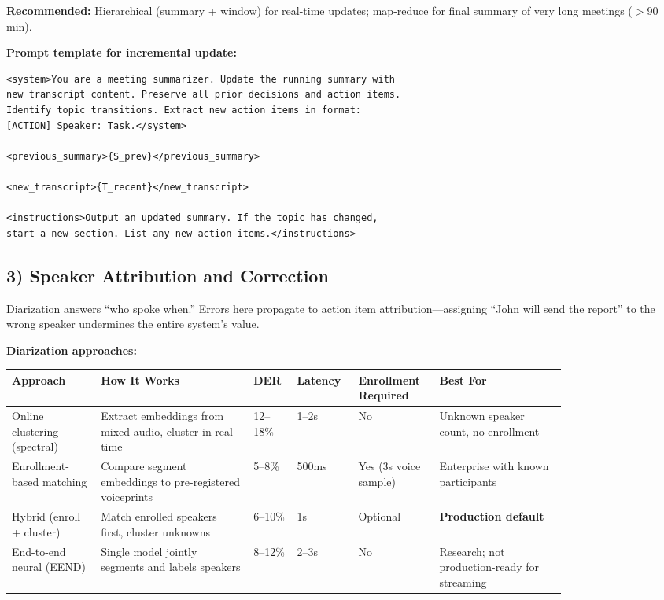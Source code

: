 \textbf{Recommended:} Hierarchical (summary + window) for real-time updates; map-reduce for final summary of very long meetings ($>$90 min).

\textbf{Prompt template for incremental update:}

\begin{verbatim}
<system>You are a meeting summarizer. Update the running summary with
new transcript content. Preserve all prior decisions and action items.
Identify topic transitions. Extract new action items in format:
[ACTION] Speaker: Task.</system>

<previous_summary>{S_prev}</previous_summary>

<new_transcript>{T_recent}</new_transcript>

<instructions>Output an updated summary. If the topic has changed,
start a new section. List any new action items.</instructions>
\end{verbatim}

\subsection*{3) Speaker Attribution and Correction}

Diarization answers ``who spoke when.'' Errors here propagate to action item attribution---assigning ``John will send the report'' to the wrong speaker undermines the entire system's value.

\textbf{Diarization approaches:}

\begin{tabular}{|p{0.14\linewidth}|p{0.24\linewidth}|p{0.06\linewidth}|p{0.08\linewidth}|p{0.10\linewidth}|p{0.20\linewidth}|}
\hline
\textbf{Approach} & \textbf{How It Works} & \textbf{DER} & \textbf{Latency} & \textbf{Enrollment Required} & \textbf{Best For} \\
\hline
Online clustering (spectral) & Extract embeddings from mixed audio, cluster in real-time & 12--18\% & 1--2s & No & Unknown speaker count, no enrollment \\
\hline
Enrollment-based matching & Compare segment embeddings to pre-registered voiceprints & 5--8\% & 500ms & Yes (3s voice sample) & Enterprise with known participants \\
\hline
Hybrid (enroll + cluster) & Match enrolled speakers first, cluster unknowns & 6--10\% & 1s & Optional & \textbf{Production default} \\
\hline
End-to-end neural (EEND) & Single model jointly segments and labels speakers & 8--12\% & 2--3s & No & Research; not production-ready for streaming \\
\hline
\end{tabular}

